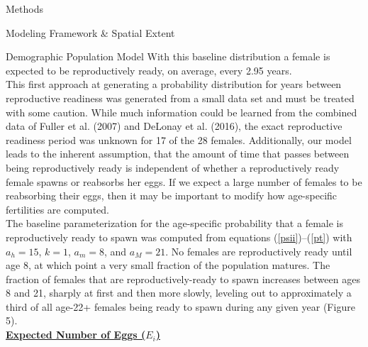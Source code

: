 \documentclass[12pt]{article}
\begin{document}
\begin{section}{Methods}
\begin{subsection}{Modeling Framework \& Spatial Extent}
\begin{subsubsection}{Demographic Population Model}
With this baseline distribution a female is expected to be reproductively ready, on average, every 2.95 years.\\  

This first approach at generating a probability distribution for years between reproductive readiness was generated from a small data set and must be treated with some caution.  While much information could be learned from the combined data of Fuller et al. (2007) and DeLonay et al. (2016), the exact reproductive readiness period was unknown for 17 of the 28 females.  Additionally, our model leads to the inherent assumption, that the amount of time that passes between being reproductively ready is independent of whether a reproductively ready female spawns or reabsorbs her eggs.  If we expect a large number of females to be reabsorbing their eggs, then it may be important to modify how age-specific fertilities are computed.\\

The baseline parameterization for the age-specific probability that a female is reproductively ready to spawn was computed from equations (\ref{psii})--(\ref{pt}) with $a_h=15$, $k=1$, $a_m=8$, and $a_M=21$.  No females are reproductively ready until age 8, at which point a very small fraction of the population matures.  The fraction of females that are reproductively-ready to spawn increases between ages 8 and 21, sharply at first and then more slowly, leveling out to approximately a third of all age-22+ females being ready to spawn during any given year (Figure 5).\\

\textbf{\underline{Expected Number of Eggs ($E_i$)}}\\


\end{subsubsection}
\end{subsection}
\end{section}
\end{document}
